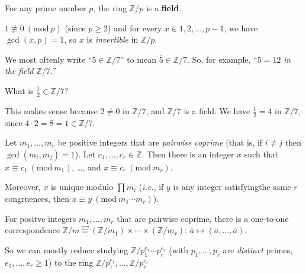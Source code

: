 \documentclass{notes}
\begin{document}
\begin{cor}
  For any prime number $p$, the ring $\mathbb Z / p$ is a {\boldmath \bfseries field}.
\end{cor}

\begin{prf}
  $1 \nequiv 0\ (\mathrm{mod}\ p)$ (since $p \geq 2$) and for every $x \in 1, 2, \dots, p - 1$, we have $\gcd(x, p) = 1$, so $x$ is \textit{invertible} in $\mathbb Z / p$.
\end{prf}

\begin{rmk}
  We most oftenly write ``$5 \in \mathbb Z / 7$'' to mean $\overline 5 \in \mathbb Z / 7$.
  So, for example, ``$5 = 12$ \textit{in the field $\mathbb Z / 7$.}''
\end{rmk}

\begin{eg}
  What is $\frac{1}{2} \in \mathbb Z / 7$?

  This makes sense because $2 \neq 0$ in $\mathbb Z / 7$, and $\mathbb Z / 7$ is a field.
  We have $\frac{1}{2} = 4$ in $\mathbb Z / 7$, since $4 \cdot 2 = 8 = 1 \in \mathbb Z / 7$.
\end{eg}

\begin{thm}
  Let $m_1, \dots, m_r$ be positive integers that are \textit{pairwise coprime} (that is, if $i \neq j$ then $\gcd(m_i, m_j) = 1$).
  Let $c_1, \dots, c_r \in \mathbb Z$.
  Then there is an integer $x$ such that $x \equiv c_1\ (\mathrm{mod}\ m_1)$, \dots, and $x \equiv c_r\ (\mathrm{mod}\ m_r)$.

  Moreover, $x$ is unique modulo $\prod m_i$ (\textit{i.e.}, if $y$ is any integer satisfyingthe same $r$ congruences, then $x \equiv y\ (\mathrm{mod}\ m_1 \cdots m_r)$).
\end{thm}

\begin{cor}
  For positve integers $m_1, \dots, m_r$ that are pairwise coprime, there is a one-to-one correspondence $\mathbb Z / m \overset{\longrightarrow}{\cong} (\mathbb Z / m_1) \times \cdots \times (\mathbb Z / m_r)$: $\overline a \mapsto (\overline a, \dots, \overline a)$.

  So we can mostly reduce studying $\mathbb Z / p_1^{e_1} \cdots p_r^{e_r}$ (with $p_1, \dots, p_r$ are \textit{distinct} primes, $e_1, \dots, e_r \geq 1$) to the ring $\mathbb Z / p_1^{e_1}, \dots, \mathbb Z / p_r^{e_r}$
\end{cor}
\end{document}
